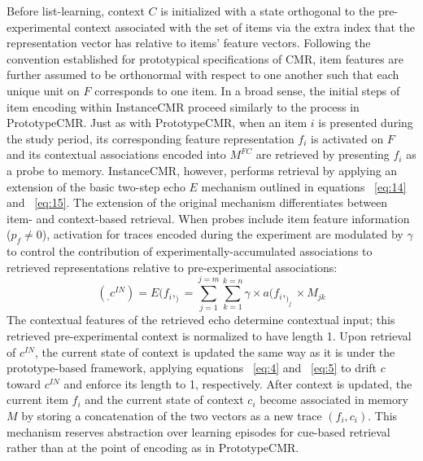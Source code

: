 {}Before list-learning, context $C$ is initialized with a state orthogonal to the pre-experimental context associated with the set of items via the extra index that the representation vector has relative to items’ feature vectors. Following the convention established for prototypical specifications of CMR, item features are further assumed to be orthonormal with respect to one another such that each unique unit on $F$ corresponds to one item.\markdownRendererInterblockSeparator
{}\markdownRendererInterblockSeparator
{}In a broad sense, the initial steps of item encoding within InstanceCMR proceed similarly to the process in PrototypeCMR. Just as with PrototypeCMR, when an item $i$ is presented during the study period, its corresponding feature representation $f_i$ is activated on $F$ and its contextual associations encoded into $M^{FC}$ are retrieved by presenting $f_i$ as a probe to memory. InstanceCMR, however, performs retrieval by applying an extension of the basic two-step echo $E$ mechanism outlined in equations ~\ref{eq:14} and ~\ref{eq:15}. \markdownRendererInterblockSeparator
{}The extension of the original mechanism differentiates between item- and context-based retrieval. When probes include item feature information ($p_f \neq 0$), activation for traces encoded during the experiment are modulated by $\gamma$ to control the contribution of experimentally-accumulated associations to retrieved representations relative to pre-experimental associations:\markdownRendererInterblockSeparator
{}\begin{equation} \label{eq:19} (_, c^{IN}) = E(f_i, _) = \sum^{j=m}_{j=1}\sum^{k=n}_{k=1} {\gamma} \times a(f_i, _)_j \times M_{jk} \end{equation}\markdownRendererInterblockSeparator
{}The contextual features of the retrieved echo determine contextual input; this retrieved pre-experimental context is normalized to have length 1. Upon retrieval of $c^{IN}$, the current state of context is updated the same way as it is under the prototype-based framework, applying equations ~\ref{eq:4} and ~\ref{eq:5} to drift $c$ toward $c^{IN}$ and enforce its length to 1, respectively.\markdownRendererInterblockSeparator
{}After context is updated, the current item $f_i$ and the current state of context $c_i$ become associated in memory $M$ by storing a concatenation of the two vectors as a new trace $(f_i, c_i)$. This mechanism reserves abstraction over learning episodes for cue-based retrieval rather than at the point of encoding as in PrototypeCMR.\markdownRendererInterblockSeparator
